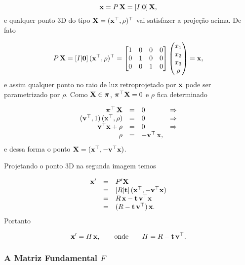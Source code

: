 \begin{equation*}
\mathbf{x}=P\,\mathbf{X}=[I|{\bf 0}]\,\mathbf{X},
\end{equation*}
e qualquer ponto 3D do tipo $\mathbf{X}=(\mathbf{x}^\top,\rho)^\top$ vai satisfazer a projeção acima. De fato

\begin{equation*}
P\,\mathbf{X}=
[I|{\bf 0}]\,(\mathbf{x}^\top,\rho)^\top=
\begin{bmatrix}
1&0&0&0\\
0&1&0&0\\
0&0&1&0
\end{bmatrix}
\begin{pmatrix}
x_1\\
x_2\\
x_3\\
\rho
\end{pmatrix}
=\mathbf{x},
\end{equation*}
e assim qualquer ponto no raio de luz retroprojetado por $\mathbf{x}$ pode ser parametrizado por $\rho$. Como $\mathbf{X}\in\boldsymbol{\pi}$, $\boldsymbol{\pi}^\top\mathbf{X}=0$ e  
$\rho$ fica determinado

\begin{equation*}
\begin{array}{rcll}
\boldsymbol{\pi}^\top\,\mathbf{X}&=&0&\Rightarrow\\
({\bf v}^\top,1)\,(\mathbf{x}^\top,\rho)&=&0&\Rightarrow\\
{\bf v}^\top\mathbf{x}+\rho&=&0&\Rightarrow\\
\rho&=&-{\bf v}^\top\,\mathbf{x},&
\end{array}
\end{equation*}
e dessa forma o ponto $\mathbf{X}=(\mathbf{x}^\top,-{\bf v}^\top\mathbf{x})$.

Projetando o ponto 3D na segunda imagem temos

\begin{equation*}
\begin{array}{rcl}
\mathbf{x}'&=&P'\mathbf{X}\\
&=&[R|{\bf t}]\,(\mathbf{x}^\top,-{\bf v}^\top\mathbf{x})\\
&=&R\,\mathbf{x}-{\bf t}\,{\bf v}^\top\mathbf{x}\\
&=&(R-{\bf t}\,{\bf v}^\top)\,\mathbf{x}.
\end{array}
\end{equation*}
Portanto

\begin{equation*}
\mathbf{x}'=H\,\mathbf{x},\qquad\text{onde}\qquad H=R-{\bf t}\,{\bf v}^\top.
\end{equation*}


\subsubsection{A Matriz Fundamental $F$}\label{sec.matriz-F}

